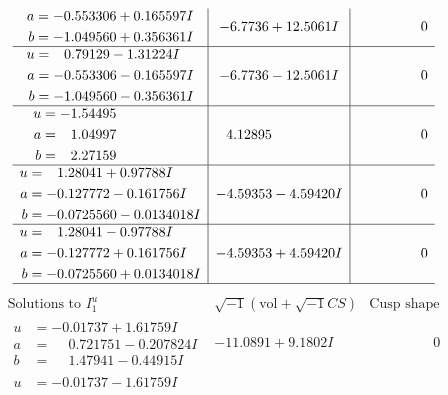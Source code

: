 \documentclass[1p]{elsarticle_modified}
\theoremstyle{definition}
\newcommand{\I}{\sqrt{-1}}
\begin{document}
$$\begin{array}{c|c|c}
\begin{aligned}
a &= -0.553306 + 0.165597 I \\
b &= -1.049560 + 0.356361 I\end{aligned}
 & -6.7736 + 12.5061 I & \phantom{-0.000000 } 0 \\ \hline\begin{aligned}
u &= \phantom{-}0.79129 - 1.31224 I \\
a &= -0.553306 - 0.165597 I \\
b &= -1.049560 - 0.356361 I\end{aligned}
 & -6.7736 - 12.5061 I & \phantom{-0.000000 } 0 \\ \hline\begin{aligned}
u &= -1.54495\phantom{ +0.000000I} \\
a &= \phantom{-}1.04997\phantom{ +0.000000I} \\
b &= \phantom{-}2.27159\phantom{ +0.000000I}\end{aligned}
 & \phantom{-}4.12895\phantom{ +0.000000I} & \phantom{-0.000000 } 0 \\ \hline\begin{aligned}
u &= \phantom{-}1.28041 + 0.97788 I \\
a &= -0.127772 - 0.161756 I \\
b &= -0.0725560 - 0.0134018 I\end{aligned}
 & -4.59353 - 4.59420 I & \phantom{-0.000000 } 0 \\ \hline\begin{aligned}
u &= \phantom{-}1.28041 - 0.97788 I \\
a &= -0.127772 + 0.161756 I \\
b &= -0.0725560 + 0.0134018 I\end{aligned}
 & -4.59353 + 4.59420 I & \phantom{-0.000000 } 0\\
 \hline 
 \end{array}$$\newpage$$\begin{array}{c|c|c}  
\text{Solutions to }I^u_{1}& \I (\text{vol} + \sqrt{-1}CS) & \text{Cusp shape}\\
 \hline 
\begin{aligned}
u &= -0.01737 + 1.61759 I \\
a &= \phantom{-}0.721751 - 0.207824 I \\
b &= \phantom{-}1.47941 - 0.44915 I\end{aligned}
 & -11.0891 + 9.1802 I & \phantom{-0.000000 } 0 \\ \hline\begin{aligned}
u &= -0.01737 - 1.61759 I \\

\end{aligned}
\end{array}$$
\end{document}
